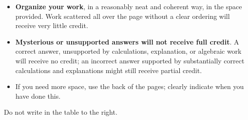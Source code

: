 \documentclass[11pt]{exam}
\begin{document}
\begin{minipage}[t]{3.7in}
\vspace{0pt}
\begin{itemize}

\item \textbf{Organize your work}, in a reasonably neat and coherent way, in
the space provided. Work scattered all over the page without a clear ordering will 
receive very little credit.  

\item \textbf{Mysterious or unsupported answers will not receive full
credit}.  A correct answer, unsupported by calculations, explanation,
or algebraic work will receive no credit; an incorrect answer supported
by substantially correct calculations and explanations might still receive
partial credit.

\item If you need more space, use the back of the pages; clearly indicate when you have done this.
\end{itemize}

Do not write in the table to the right.
\end{minipage}
\hfill
\begin{minipage}[t]{2.3in}
\vspace{0pt}
\addpoints %
\gradetable[v]%

\end{minipage}
\newpage %

%
%
%
\end{document}

